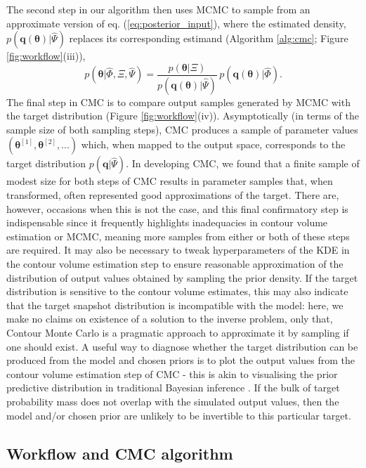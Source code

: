 The second step in our algorithm then uses MCMC to sample from an approximate version of eq. (\ref{eq:posterior_input}), where the estimated density, $p(\boldsymbol{q}(\boldsymbol{\theta})|\hat{\Psi})$ replaces its corresponding estimand (Algorithm \ref{alg:cmc}; Figure \ref{fig:workflow}(iii)),
%
\begin{equation}\label{eq:posterior_input_estimated}
p(\boldsymbol{\theta}|\hat{\Phi},\Xi,\hat{\Psi}) =
\frac{p(\boldsymbol{\theta}|\Xi)}{p(\boldsymbol{q}(\boldsymbol{\theta})|\hat{\Psi})} \,
p(\boldsymbol{q}(\boldsymbol{\theta})|\hat{\Phi}).
\end{equation}
%
The final step in CMC is to compare output samples generated by MCMC with the target distribution (Figure \ref{fig:workflow}(iv)). Asymptotically (in terms of the sample size of both sampling steps), CMC produces a sample of parameter values $(\boldsymbol{\theta}^{[1]},\boldsymbol{\theta}^{[2]},...)$ which, when mapped to the output space, corresponds to the target distribution $p(\boldsymbol{q}|\hat{\Psi})$. In developing CMC, we found that a finite sample of modest size for both steps of CMC results in parameter samples that, when transformed, often represented good approximations of the target. There are, however, occasions when this is not the case, and this final confirmatory step is indispensable since it frequently highlights inadequacies in contour volume estimation or MCMC, meaning more samples from either or both of these steps are required. It may also be necessary to tweak hyperparameters of the KDE in the contour volume estimation step to ensure reasonable approximation of the distribution of output values obtained by sampling the prior density. If the target distribution is sensitive to the contour volume estimates, this may also indicate that the target snapshot distribution is incompatible with the model: here, we make no claims on existence of a solution to the inverse problem, only that, Contour Monte Carlo is a pragmatic approach to approximate it by sampling if one should exist. A useful way to diagnose whether the target distribution can be produced from the model and chosen priors is to plot the output values from the contour volume estimation step of CMC - this is akin to visualising the prior predictive distribution in traditional Bayesian inference \cite{lambert2018Student}. If the bulk of target probability mass does not overlap with the simulated output values, then the model and/or chosen prior are unlikely to be invertible to this particular target.

\subsection{Workflow and CMC algorithm}

